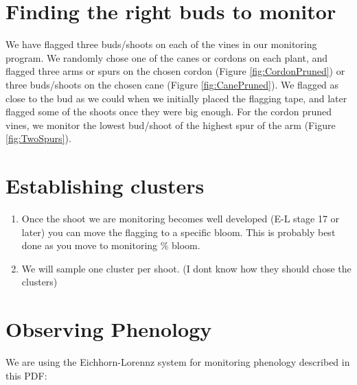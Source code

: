 \documentclass[11pt,letter]{article}
\begin{document}
\section{Finding the right buds to monitor}
We have flagged three buds/shoots on each of the vines in our monitoring program. We randomly chose one of the canes or cordons on each plant, and flagged three arms or spurs on the chosen cordon (Figure \ref{fig:CordonPruned}) or three buds/shoots on the chosen cane (Figure \ref{fig:CanePruned}). We flagged as close to the bud as we could when we initially placed the flagging tape, and later flagged some of the shoots once they were big enough. For the cordon pruned vines, we monitor the lowest bud/shoot of the highest spur of the arm (Figure \ref{fig:TwoSpurs}). 

\section{Establishing clusters}
\begin{enumerate}
	\item Once the shoot we are monitoring becomes well developed (E-L stage 17 or later) you can move the flagging to a specific bloom. This is probably best done as you move to monitoring \% bloom. 
	\item We will sample one cluster per shoot. 
	(I dont know how they should chose the clusters)

\end{enumerate}

\section{Observing Phenology}
We are using the Eichhorn-Lorennz system for monitoring phenology described in this PDF: \\
\end{document}
